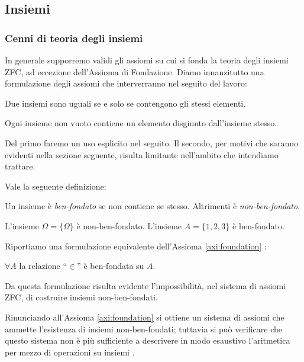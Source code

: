 \subsection{Insiemi}
\subsubsection{Cenni di teoria degli insiemi}
In generale supporremo validi gli assiomi su cui si fonda la teoria degli insiemi ZFC, ad eccezione dell'Assioma di Fondazione. Diamo innanzitutto una formulazione degli assiomi che interverranno nel seguito del lavoro:
\begin{axiom}[di estensionalità]
    Due insiemi sono uguali se e solo se contengono gli stessi elementi.
\end{axiom}

\begin{axiom}[di fondazione]
    Ogni insieme non vuoto contiene un elemento disgiunto dall'insieme stesso.
    \label{axi:foundation}
\end{axiom}
Del primo faremo un uso esplicito nel seguito. Il secondo, per motivi che saranno evidenti nella sezione seguente, risulta limitante nell'ambito che intendiamo trattare.

Vale la seguente definizione:
\begin{definition}
    Un insieme è \emph{ben-fondato} se non contiene se stesso. Altrimenti è \emph{non-ben-fondato}.
\end{definition}

\begin{example}
    L'insieme $\Omega = \{\Omega\}$ è non-ben-fondato. L'insieme $A = \{1,2,3\}$ è ben-fondato.
\end{example}

Riportiamo una formulazione equivalente dell'Assioma \ref{axi:foundation} \cite[Chapter III.4]{kunen}:
\begin{axiom*}
    $\forall A$ la relazione ``$\in$'' è ben-fondata su $A$.
\end{axiom*}

Da questa formulazione risulta evidente l'impossibilità, nel sistema di assiomi ZFC, di costruire insiemi non-ben-fondati.

Rinunciando all'Assioma \ref{axi:foundation} si ottiene un sistema di assiomi che ammette l'esistenza di insiemi non-ben-fondati; tuttavia si può verificare che questo sistema non è più sufficiente a descrivere in modo esaustivo l'aritmetica per mezzo di operazioni su insiemi \cite{aczel}.

